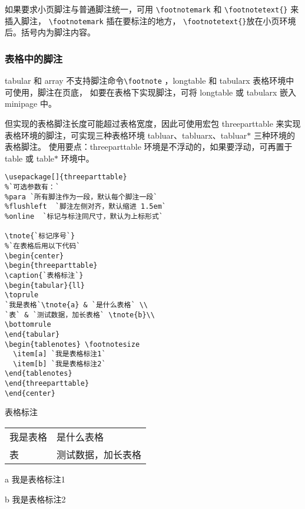 如果要求小页脚注与普通脚注统一，可用 \verb|\footnotemark| 和  \verb|\footnotetext{}| 来插入脚注，
 \verb|\footnotemark| 插在要标注的地方， \verb|\footnotetext{}|放在小页环境后。括号内为脚注内容。

\subsubsection{表格中的脚注}
tabular 和 array 不支持脚注命令\verb|\footnote| ，longtable 和 tabularx 表格环境中可使用，脚注在页底，
如要在表格下实现脚注，可将 longtable 或 tabularx 嵌入 minipage 中。

但实现的表格脚注长度可能超过表格宽度，因此可使用宏包 threeparttable 来实现表格环境的脚注，可实现三种表格环境
tabluar、tabluarx、tabluar$*$ 三种环境的表格脚注。
使用要点：threeparttable 环境是不浮动的，如果要浮动，可再置于 table 或 table$*$ 环境中。
\begin{lstlisting}[language={[LaTeX]TeX}]
\usepackage[]{threeparttable}
%`可选参数有：`
%para `所有脚注作为一段，默认每个脚注一段`
%flushleft  `脚注左侧对齐，默认缩进 1.5em`
%online  `标记与标注同尺寸，默认为上标形式`

\tnote{`标记序号`}
%`在表格后用以下代码`
\begin{center}
\begin{threeparttable}
\caption{`表格标注`}
\begin{tabular}{ll}
\toprule
`我是表格`\tnote{a} & `是什么表格` \\
`表` & `测试数据，加长表格` \tnote{b}\\
\bottomrule
\end{tabular}
\begin{tablenotes} \footnotesize
  \item[a] `我是表格标注1`
  \item[b] `我是表格标注2`
\end{tablenotes}
\end{threeparttable}
\end{center}
\end{lstlisting}

\begin{center}
\begin{threeparttable}
\caption{表格标注}
\begin{tabular}{ll}
\toprule
我是表格\tnote{a}&是什么表格\\
表&测试数据，加长表格\tnote{b}\\
\bottomrule
\end{tabular}
\begin{tablenotes} \footnotesize
  \item[a] 我是表格标注1
  \item[b] 我是表格标注2
\end{tablenotes}
\end{threeparttable}
\end{center}

